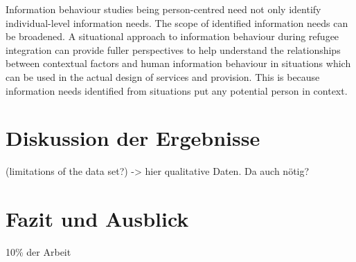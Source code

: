 \documentclass[12pt,oneside]{article}
\begin{document}
Information behaviour studies being person-centred need
not only identify individual-level information needs. The
scope of identified information needs can be broadened. A
situational approach to information behaviour during
refugee integration can provide fuller perspectives to help
understand the relationships between contextual factors and
human information behaviour in situations which can be
used in the actual design of services and provision. This is
because information needs identified from situations put
any potential person in context.







\section{Diskussion der Ergebnisse}
(limitations of the data set?) -> hier qualitative Daten. Da auch nötig?

\section{Fazit und Ausblick}

10\% der Arbeit

\clearpage
\lhead{}
\printbibliography
{}



\newpage
\end{document}
